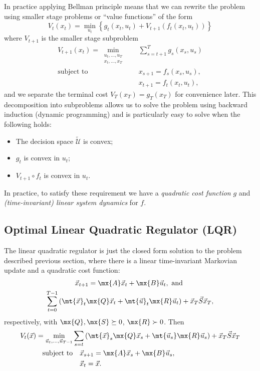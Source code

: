 \documentclass[margin=small]{hsrzf}
\begin{document}
In practice applying Bellman principle means that we can rewrite the problem
using smaller stage problems or ``value functions'' of the form
\[
  V_t(x_t) = \min_{u_t} \left\{
    g_t(x_t, u_t) + V_{t+1}(f_t(x_t, u_t))
  \right\}
\]
where $V_{t+1}$ is the smaller stage subproblem
\begin{align*}
  V_{t+1}(x_t) = \min_{\substack{{u_t,\ldots,u_T} \\ {x_t,\ldots,x_T}}}
    &\quad \sum_{s={t+1}}^T g_s(x_s, u_s) \\
  \text{subject to} &\quad x_{s+1} = f_s(x_s, u_s), \\
    &\quad x_{t+1} = f_{t}(x_{t}, u_{t}),
\end{align*}
and we separate the terminal cost $V_T(x_T) = g_T(x_T)$ for convenience later.
This decomposition into subproblems allows us to solve the problem using
backward induction (dynamic programming) and is particularly easy to solve
when the following holds:
\begin{itemize}
  \item The decision space $\tilde{\mathcal{U}}$ is convex;
  \item $g_t$ is convex in $u_t$;
  \item $V_{t+1} \circ f_t$ is convex in $u_t$.
\end{itemize}
In practice, to satisfy these requirement we have a \emph{quadratic cost
function} $g$ and \emph{(time-invariant) linear system dynamics} for $f$.

\subsection{Optimal Linear Quadratic Regulator (LQR)}

The linear quadratic regulator is just the closed form solution to the problem
described previous section, where there is a linear time-invariant Markovian
update and a quadratic cost function:
\begin{gather*}
  \vec{x}_{t+1} = \mx{A} \vec{x}_{t} + \mx{B} \vec{u}_t, \text{ and } \\
  \sum_{t=0}^{T-1} \left(
      \mt{\vec{x}}_t \mx{Q} \vec{x}_t + \mt{\vec{u}}_t \mx{R} \vec{u}_t
    \right)
    + \vec{x}_T \vec{S} \vec{x}_T,
\end{gather*}
respectively, with $\mx{Q},\mx{S} \succeq 0$, $\mx{R}\succ 0$. Then
\begin{align*}
  V_t(\vec{x}) = \min_{\vec{u}_t, \ldots, \vec{u}_{T-1}}
    &\sum_{s=t} \left(
      \mt{\vec{x}}_s \mx{Q} \vec{x}_s + \mt{\vec{u}_s} \mx{R} \vec{u}_s
    \right)
    + \vec{x}_T \vec{S} \vec{x}_T \\
  \text{subject to} &\quad \vec{x}_{s+1}
      = \mx{A} \vec{x}_s + \mx{B} \vec{u}_s, \\
    &\quad \vec{x}_t = \vec{x}.
\end{align*}
\end{document}
